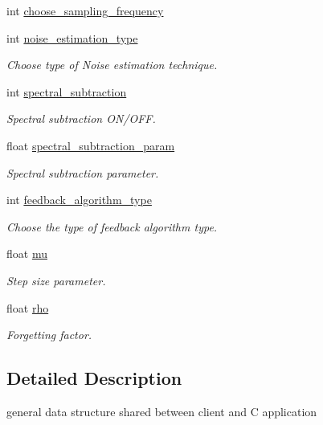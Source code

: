 \begin{DoxyCompactItemize}
int \mbox{\hyperlink{structosp__user__data__t_a7aac3aa1476589a9014fef82cbcc4c4c}{choose\+\_\+sampling\+\_\+frequency}}
\item 
int \mbox{\hyperlink{structosp__user__data__t_ab6c6864ef4a835caedfac8f7757d3646}{noise\+\_\+estimation\+\_\+type}}
\begin{DoxyCompactList}\small\item\em Choose type of Noise estimation technique. \end{DoxyCompactList}\item 
int \mbox{\hyperlink{structosp__user__data__t_a4d4b5738a5abe27d67dbbc278959defa}{spectral\+\_\+subtraction}}
\begin{DoxyCompactList}\small\item\em Spectral subtraction O\+N/\+O\+FF. \end{DoxyCompactList}\item 
float \mbox{\hyperlink{structosp__user__data__t_a21ab3e8e57f137d0308868f84d09631f}{spectral\+\_\+subtraction\+\_\+param}}
\begin{DoxyCompactList}\small\item\em Spectral subtraction parameter. \end{DoxyCompactList}\item 
int \mbox{\hyperlink{structosp__user__data__t_aeae512f404bfdf2bc27256e92064f9ca}{feedback\+\_\+algorithm\+\_\+type}}
\begin{DoxyCompactList}\small\item\em Choose the type of feedback algorithm type. \end{DoxyCompactList}\item 
float \mbox{\hyperlink{structosp__user__data__t_a189ecf1c6b08ec178e823f4802c1996c}{mu}}
\begin{DoxyCompactList}\small\item\em Step size parameter. \end{DoxyCompactList}\item 
float \mbox{\hyperlink{structosp__user__data__t_ab930615d0d22f7b4becc3321b82787a5}{rho}}
\begin{DoxyCompactList}\small\item\em Forgetting factor. \end{DoxyCompactList}\end{DoxyCompactItemize}


\subsection{Detailed Description}
general data structure shared between client and C application 

